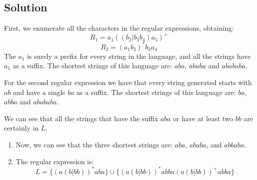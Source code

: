 \documentclass[12pt, a4paper]{report}
\newtheorem[style=M,bodystyle=\normalfont]{theorem}{Theorem}
\newtheorem[style=M,bodystyle=\normalfont]{corollary}{Corollary}
\newtheorem[style=M,bodystyle=\normalfont]{lemma}{Lemma}
\newtheorem[style=M,bodystyle=\normalfont]{definition}{Definition}
\begin{document}
    \subsection*{Solution}
        First, we enumerate all the characters in the regular expressions, obtaining: 
        \[R_1=a_1((b_2|b_3b_4)a_5)^{+}\]
        \[R_2=(a_1b_2)^{*}b_3a_4\]
        The $a_1$ is surely a prefix for every string in the language, and all the strings have $a_5$ as a suffix. The shortest strings of this language are: $aba$, $ababa$ and $abababa$. 
        
        For the second regular expression we have that every string generated starts with $ab$ and have a single $ba$ as a suffix. The shortest strings of this language are: $ba$, $abba$ and $abababa$. 
        
        We can see that all the strings that have the suffix $aba$ or have at least two $bb$ are certainly in $L$. 

        \begin{enumerate}
            \item Now, we can see that the three shortest strings are: $aba$, $ababa$, and $abbaba$. 
            \item The regular expression is: 
                \[L=\{(a(b|bb))^{*}aba\} \cup \{(a(b|bb))^{*}abba(a(b|bb))^{+}abba\}\]
        \end{enumerate}    
\end{document}
